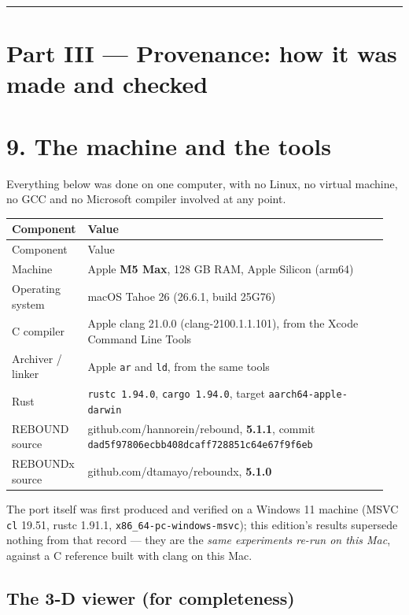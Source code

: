 \documentclass[11pt]{article}
\begin{document}
\bigskip\hrule\bigskip

\clearpage
\section*{Part III --- Provenance: how it was made and checked}

\section{9. The machine and the tools}

Everything below was done on one computer, with no Linux, no virtual machine, no GCC and no Microsoft compiler involved at any point.

\begin{longtable}{L{0.151\linewidth}L{0.799\linewidth}}
\toprule
Component & Value \\
\midrule
\endfirsthead
\toprule
Component & Value \\
\midrule
\endhead
Machine & Apple \textbf{M5 Max}, 128 GB RAM, Apple Silicon (arm64) \\
Operating system & macOS Tahoe 26 (26.6.1, build 25G76) \\
C compiler & Apple clang 21.0.0 (clang-2100.1.1.101), from the Xcode Command Line Tools \\
Archiver / linker & Apple \texttt{ar} and \texttt{ld}, from the same tools \\
Rust & \texttt{rustc 1.94.0}, \texttt{cargo 1.94.0}, target \texttt{aarch64-apple-darwin} \\
REBOUND source & github.com/hannorein/rebound, \textbf{5.1.1}, commit \texttt{dad5f97806ecbb408dcaff728851c64e67f9f6eb} \\
REBOUNDx source & github.com/dtamayo/reboundx, \textbf{5.1.0} \\
\bottomrule
\end{longtable}

The port itself was first produced and verified on a Windows 11 machine (MSVC \texttt{cl} 19.51, rustc 1.91.1, \texttt{x86\_64-pc-windows-msvc}); this edition's results supersede nothing from that record --- they are the \emph{same experiments re-run on this Mac}, against a C reference built with clang on this Mac.

\subsection{The 3-D viewer (for completeness)}
\end{document}
